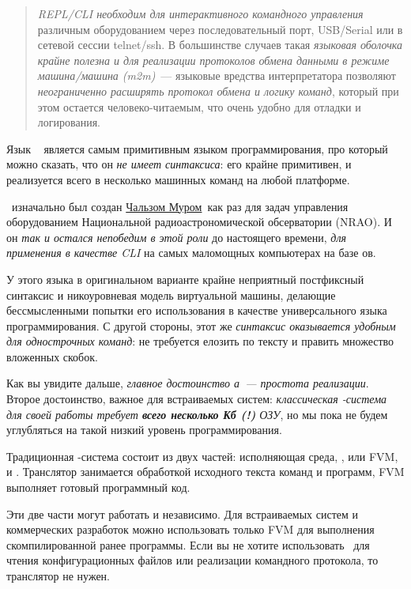 \begin{quotation}\noindent
\emph{REPL/CLI необходим для интерактивного командного управления} различным
оборудованием через последовательный порт, USB/Serial или в сетевой сессии
telnet/ssh. В большинстве случаев такая \emph{языковая оболочка крайне полезна и
для реализации протоколов обмена данными в режиме машина/машина (m2m)}\ ---
языковые вредства интерпретатора позволяют \emph{неограниченно расширять
протокол обмена и логику команд}, который при этом остается человеко-читаемым,
что очень удобно для отладки и логирования.
\end{quotation}

\clearpage
Язык \F\ \cite{starting} является самым примитивным языком программирования, про
который можно сказать, что он \textit{не имеет синтаксиса}: его 
крайне примитивен, и реализуется всего в несколько машинных команд на любой
платформе.

\F\ изначально был создан
\href{https://ru.wikipedia.org/wiki/%D0%9C%D1%83%D1%80,\_%D0%A7%D0%B0%D1%80%D0%BB%D1%8C%D0%B7\_(%D0%BF%D1%80%D0%BE%D0%B3%D1%80%D0%B0%D0%BC%D0%BC%D0%B8%D1%81%D1%82)}{Чальзом
Муром}\ как раз для задач управления оборудованием Национальной
радиоастрономической обсерватории (NRAO). И он \textit{так и остался непобедим в
этой роли} до настоящего времени, \textit{для применения в качестве CLI} на
самых маломощных компьютерах на базе ов.

У этого языка в оригинальном варианте крайне неприятный постфиксный синтаксис и
никоуровневая модель виртуальной машины, делающие бессмысленными попытки
его использования в качестве универсального языка программирования. С другой
стороны, этот же \textit{синтаксис оказывается удобным для однострочных
команд}: не требуется елозить по тексту и править множество вложенных скобок.

\clearpage
Как вы увидите дальше, \emph{главное достоинство \F а\ --- простота реализации}.
Второе достоинство, важное для встраиваемых систем: \emph{классическая
\F-система для своей работы требует \textbf{всего несколько Кб (!)} ОЗУ}, но мы
пока не будем углубляться на такой низкий уровень программирования.

\bigskip
Традиционная \F-система состоит из двух частей: исполняющая среда,
, или FVM, и
. Транслятор занимается обработкой исходного текста команд и
программ, FVM выполняет готовый программный код.

Эти две части могут работать и независимо. Для встраиваемых систем и
коммерческих разработок можно использовать только FVM для выполнения
скомпилированной ранее программы. Если вы не хотите использовать \F\ для чтения
конфигурационных файлов или реализации командного протокола, то транслятор не
нужен.

